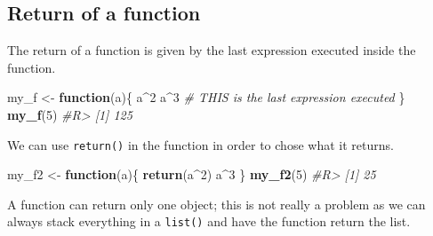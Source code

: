 \documentclass[]{book}
\newenvironment{Shaded}{}{}
\newcommand{\CommentTok}[1]{\textcolor[rgb]{0.38,0.63,0.69}{\textit{#1}}}
\newcommand{\ControlFlowTok}[1]{\textcolor[rgb]{0.00,0.44,0.13}{\textbf{#1}}}
\newcommand{\DataTypeTok}[1]{\textcolor[rgb]{0.56,0.13,0.00}{#1}}
\newcommand{\DecValTok}[1]{\textcolor[rgb]{0.25,0.63,0.44}{#1}}
\newcommand{\KeywordTok}[1]{\textcolor[rgb]{0.00,0.44,0.13}{\textbf{#1}}}
\newcommand{\NormalTok}[1]{#1}
\newcommand{\OperatorTok}[1]{\textcolor[rgb]{0.40,0.40,0.40}{#1}}
\newcommand{\StringTok}[1]{\textcolor[rgb]{0.25,0.44,0.63}{#1}}
\theoremstyle{definition}
\theoremstyle{definition}
\theoremstyle{definition}
\theoremstyle{remark}
\begin{document}
\hypertarget{return-of-a-function}{%
\subsection{Return of a function}\label{return-of-a-function}}

The return of a function is given by the last expression executed inside
the function.

\begin{Shaded}
\begin{Highlighting}[]
\NormalTok{my_f <-}\StringTok{ }\ControlFlowTok{function}\NormalTok{(a)\{}
\NormalTok{  a}\OperatorTok{^}\DecValTok{2}
\NormalTok{  a}\OperatorTok{^}\DecValTok{3} \CommentTok{# THIS is the last expression executed}
\NormalTok{\}}
\KeywordTok{my_f}\NormalTok{(}\DecValTok{5}\NormalTok{)}
\CommentTok{#R> [1] 125}
\end{Highlighting}
\end{Shaded}

We can use \texttt{return()} in the function in order to chose what it
returns.

\begin{Shaded}
\begin{Highlighting}[]
\NormalTok{my_f2 <-}\StringTok{ }\ControlFlowTok{function}\NormalTok{(a)\{}
  \KeywordTok{return}\NormalTok{(a}\OperatorTok{^}\DecValTok{2}\NormalTok{)}
\NormalTok{  a}\OperatorTok{^}\DecValTok{3}
\NormalTok{\}}
\KeywordTok{my_f2}\NormalTok{(}\DecValTok{5}\NormalTok{)}
\CommentTok{#R> [1] 25}
\end{Highlighting}
\end{Shaded}

A function can return only one object; this is not really a problem as
we can always stack everything in a \texttt{list()} and have the
function return the list.

\begin{Shaded}
\end{Shaded}
\end{document}
